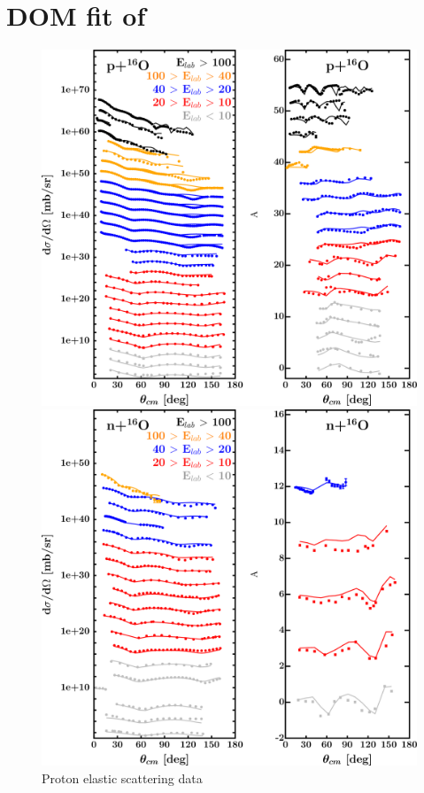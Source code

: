 \label{DOMFits}

\section{DOM fit of \oSix}

\label{O16DOMOutput}
\begin{figure}[H]
    \centering
    \begin{minipage}{0.45\textwidth}
        \centering
        \includegraphics[width=1.0\textwidth]{figures/o16_protonElastic.png}
        \caption{Proton elastic scattering data}
        \label{DOMFitData_o16_proton_elastic}
    \end{minipage}\hfill
    \begin{minipage}{0.45\textwidth}
        \centering
        \includegraphics[width=1.0\textwidth]{figures/o16_neutronElastic.png}

\end{minipage}
\end{figure}
